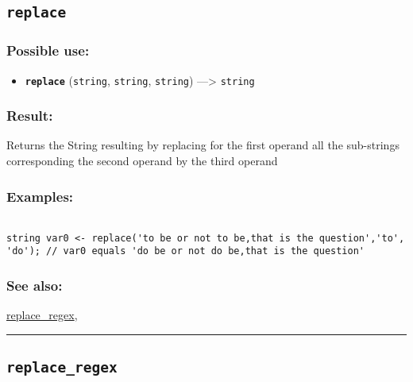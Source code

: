 \documentclass[]{book}
\providecommand{\tightlist}{%
  \setlength{\itemsep}{0pt}\setlength{\parskip}{0pt}}
\theoremstyle{definition}
\theoremstyle{definition}
\theoremstyle{definition}
\theoremstyle{remark}
\begin{document}
\subsection{\texorpdfstring{\texttt{replace}}{replace}}\label{replace}

\subsubsection{Possible use:}\label{possible-use-433}

\begin{itemize}
\tightlist
\item
  \textbf{\texttt{replace}} (\texttt{string}, \texttt{string},
  \texttt{string}) ---\textgreater{} \texttt{string}
\end{itemize}

\subsubsection{Result:}\label{result-419}

Returns the String resulting by replacing for the first operand all the
sub-strings corresponding the second operand by the third operand

\subsubsection{Examples:}\label{examples-297}

\begin{verbatim}
 
string var0 <- replace('to be or not to be,that is the question','to', 'do'); // var0 equals 'do be or not do be,that is the question'
\end{verbatim}

\subsubsection{See also:}\label{see-also-173}

\href{OperatorsNR\#replace_regex}{replace\_regex},

\begin{center}\rule{0.5\linewidth}{\linethickness}\end{center}

\subsection{\texorpdfstring{\texttt{replace\_regex}}{replace\_regex}}\label{replace_regex}
\end{document}
